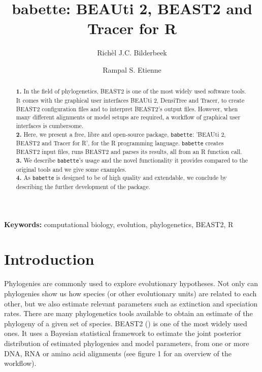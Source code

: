\documentclass{article}
\title{babette: BEAUti 2, BEAST2 and Tracer for R}
\author[1]{Rich\`el J.C. Bilderbeek}
\author[1]{Rampal S. Etienne}
\affil[1]{Groningen Institute for Evolutionary Life Sciences, University of Groningen, Groningen, The Netherlands}
\begin{document}
\maketitle

\begin{abstract}

  \textbf{1. }
    In the field of phylogenetics, 
    BEAST2 is one of the most widely used software tools. 
    It comes with the graphical user interfaces BEAUti 2, DensiTree and Tracer,
    to create BEAST2 configuration files and to interpret BEAST2's output files. 
    However, when many different alignments or model 
    setups are required, a workflow of graphical user interfaces is cumbersome. \\
  \textbf{2. }
    Here, we present a free, libre and open-source package, \verb;babette;: 
    'BEAUti 2, BEAST2 and Tracer for R', for the R programming language. 
    \verb;babette; creates BEAST2 input files, runs BEAST2 and parses its results, 
    all from an R function call. \\
  \textbf{3. }
    We describe \verb;babette;'s usage and the novel functionality it provides
    compared to the original tools and we give some examples. \\
  \textbf{4. }
    As \verb;babette; is designed to be of high quality and extendable, 
    we conclude by describing the further development of the package. \\
\end{abstract}

{\bf Keywords:} computational biology, evolution, phylogenetics, BEAST2, R

\section{Introduction}

Phylogenies are commonly used to explore evolutionary hypotheses.
Not only can phylogenies show us how species (or other
evolutionary units) are related to each other, 
but we also estimate relevant parameters such as extinction and 
speciation rates.
There are many phylogenetics tools available to obtain an estimate 
of the phylogeny of a given set of species. 
BEAST2 (\cite{bouckaert2014beast}) is one of the most widely used ones.
It uses a Bayesian statistical framework to estimate 
the joint posterior distribution of estimated phylogenies and model parameters, 
from one or more DNA, RNA or amino acid alignments (see figure 1 
for an overview of the workflow). 
\end{document}
